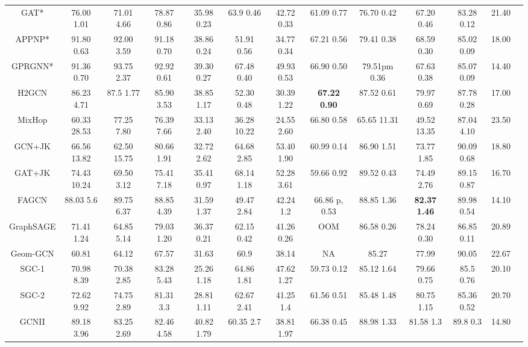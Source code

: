 \documentclass{article}
\newcommand{\0}{{\boldsymbol{0}}}
\newcommand{\6}{{\partial}}
\newcommand{\8}{{\infty}}
\newcommand{\4}{{\nabla}}
\begin{document}
\begin{table}[htbp]
\begin{tabular}{c|cccccccccc|cc}
    \midrule
    GAT*   & 76.00  1.01 & 71.01  4.66 & 78.87  0.86 & 35.98  0.23 & 63.9  0.46 & 42.72  0.33 & 61.09  0.77 & 76.70  0.42 & 67.20  0.46 & 83.28  0.12 & 21.40 \\
    APPNP* & 91.80  0.63 & 92.00  3.59 & 91.18  0.70 & 38.86  0.24 & 51.91  0.56 & 34.77  0.34 & 67.21  0.56 & 79.41  0.38 & 68.59  0.30 & 85.02  0.09 & 18.00 \\
    GPRGNN* & 91.36  0.70 & 93.75  2.37 & 92.92  0.61 & 39.30  0.27 & 67.48  0.40 & 49.93  0.53 & 66.90  0.50 & 79.51pm 0.36 & 67.63  0.38 & 85.07  0.09 & 14.40 \\
    H2GCN & 86.23  4.71 & 87.5  1.77 & 85.90  3.53 & 38.85  1.17 & 52.30  0.48 & 30.39  1.22 & \cellcolor[rgb]{ .816,  .808,  .808}\textbf{67.22  0.90} & 87.52  0.61 & 79.97  0.69 & 87.78  0.28 & 17.00 \\
    MixHop & 60.33  28.53 & 77.25  7.80 & 76.39  7.66 & 33.13  2.40 & 36.28  10.22 & 24.55  2.60 & 66.80  0.58 & 65.65  11.31 & 49.52  13.35 & 87.04  4.10 & 23.50 \\
    GCN+JK & 66.56  13.82 & 62.50  15.75 & 80.66  1.91 & 32.72  2.62 & 64.68  2.85 & 53.40  1.90 & 60.99  0.14 & 86.90  1.51 & 73.77  1.85 & 90.09  0.68 & 18.80 \\
     GAT+JK & 74.43  10.24 & 69.50  3.12 & 75.41  7.18 & 35.41  0.97 & 68.14  1.18 & 52.28  3.61 & 59.66  0.92 & 89.52  0.43 & 74.49  2.76 & 89.15  0.87 & 16.70 \\
    FAGCN & 88.03  5.6 & 89.75  6.37 & 88.85  4.39 & 31.59  1.37 & 49.47  2.84 & 42.24  1.2 & 66.86 p, 0.53 & 88.85  1.36 & \cellcolor[rgb]{ .816,  .808,  .808}\textbf{82.37  1.46} & 89.98  0.54 & 14.10 \\
    GraphSAGE & 71.41  1.24 & 64.85  5.14 & 79.03  1.20 & 36.37  0.21 & 62.15  0.42 & 41.26  0.26 & OOM   & 86.58  0.26 & 78.24  0.30 & 86.85  0.11 & 20.89 \\
    Geom-GCN & 60.81 & 64.12 & 67.57 & 31.63 & 60.9  & 38.14 & NA    & 85.27 & 77.99 & 90.05 & 22.67 \\
    \midrule
    SGC-1 & 70.98  8.39 & 70.38  2.85 & 83.28  5.43 & 25.26  1.18 & 64.86  1.81 & 47.62  1.27 & 59.73  0.12 & 85.12  1.64 & 79.66  0.75 & 85.5  0.76 & 20.10 \\
    SGC-2 & 72.62  9.92 & 74.75  2.89 & 81.31  3.3 & 28.81  1.11 & 62.67  2.41 & 41.25  1.4 & 61.56  0.51 & 85.48  1.48 & 80.75  1.15 & 85.36  0.52 & 20.70 \\
    GCNII & 89.18  3.96 & 83.25  2.69 & 82.46  4.58 & 40.82  1.79 & 60.35  2.7 & 38.81  1.97 & 66.38  0.45 & 88.98  1.33 & 81.58  1.3 & 89.8  0.3 & 14.80 \\

\end{tabular}
\end{table}
\end{document}
